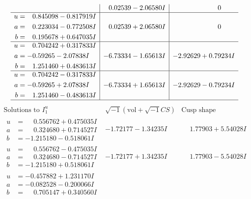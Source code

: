 \documentclass[1p]{elsarticle_modified}
\theoremstyle{definition}
\newcommand{\I}{\sqrt{-1}}
\begin{document}
$$\begin{array}{c|c|c}
 & \phantom{-}0.02539 - 2.06580 I & \phantom{-0.000000 } 0 \\ \hline\begin{aligned}
u &= \phantom{-}0.845098 - 0.817919 I \\
a &= \phantom{-}0.223034 - 0.772508 I \\
b &= \phantom{-}0.195678 + 0.647035 I\end{aligned}
 & \phantom{-}0.02539 + 2.06580 I & \phantom{-0.000000 } 0 \\ \hline\begin{aligned}
u &= \phantom{-}0.704242 + 0.317833 I \\
a &= -0.59265 - 2.07838 I \\
b &= \phantom{-}1.251460 + 0.483613 I\end{aligned}
 & -6.73334 - 1.65613 I & -2.92629 + 0.79234 I \\ \hline\begin{aligned}
u &= \phantom{-}0.704242 - 0.317833 I \\
a &= -0.59265 + 2.07838 I \\
b &= \phantom{-}1.251460 - 0.483613 I\end{aligned}
 & -6.73334 + 1.65613 I & -2.92629 - 0.79234 I\\
 \hline 
 \end{array}$$\newpage$$\begin{array}{c|c|c}  
\text{Solutions to }I^u_{1}& \I (\text{vol} + \sqrt{-1}CS) & \text{Cusp shape}\\
 \hline 
\begin{aligned}
u &= \phantom{-}0.556762 + 0.475035 I \\
a &= \phantom{-}0.324680 + 0.714527 I \\
b &= -1.215180 - 0.518061 I\end{aligned}
 & -1.72177 - 1.34235 I & \phantom{-}1.77903 + 5.54028 I \\ \hline\begin{aligned}
u &= \phantom{-}0.556762 - 0.475035 I \\
a &= \phantom{-}0.324680 - 0.714527 I \\
b &= -1.215180 + 0.518061 I\end{aligned}
 & -1.72177 + 1.34235 I & \phantom{-}1.77903 - 5.54028 I \\ \hline\begin{aligned}
u &= -0.457882 + 1.231170 I \\
a &= -0.082528 - 0.200066 I \\
b &= \phantom{-}0.705147 + 0.340560 I\end{aligned}

\end{array}$$
\end{document}
